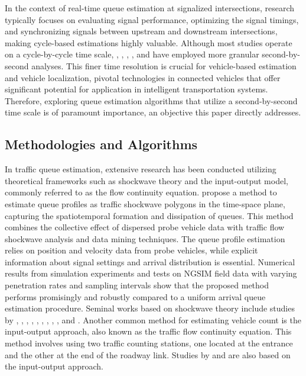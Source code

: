 In the context of real-time queue estimation at signalized intersections, research typically focuses on evaluating signal performance, optimizing the signal timings, and synchronizing signals between upstream and downstream intersections, making cycle-based estimations highly valuable. Although most studies operate on a cycle-by-cycle time scale, \textcite{vigos2008real}, \textcite{vigos2010simplified}, \textcite{aljamal2020real}, \textcite{wang2021kalman}, and \textcite{hu2022high} have employed more granular second-by-second analyses. This finer time resolution is crucial for vehicle-based estimation and vehicle localization, pivotal technologies in connected vehicles that offer significant potential for application in intelligent transportation systems. Therefore, exploring queue estimation algorithms that utilize a second-by-second time scale is of paramount importance, an objective this paper directly addresses.

\subsection{Methodologies and Algorithms}\label{LR: Methodologies and Algorithms}
In traffic queue estimation, extensive research has been conducted utilizing theoretical frameworks such as shockwave theory and the input-output model, commonly referred to as the flow continuity equation. \textcite{ramezani2015queue} propose a method to estimate queue profiles as traffic shockwave polygons in the time-space plane, capturing the spatiotemporal formation and dissipation of queues. This method combines the collective effect of dispersed probe vehicle data with traffic flow shockwave analysis and data mining techniques. The queue profile estimation relies on position and velocity data from probe vehicles, while explicit information about signal settings and arrival distribution is essential. Numerical results from simulation experiments and tests on NGSIM field data with varying penetration rates and sampling intervals show that the proposed method performs promisingly and robustly compared to a uniform arrival queue estimation procedure. Seminal works based on shockwave theory include studies by \textcite{liu2009real}, \textcite{cheng2012exploratory}, \textcite{cai2014shock}, \textcite{wang2015cycle}, \textcite{gao2019connected}, \textcite{yao2019cycle}, \textcite{ban2011real}, \textcite{cheng2011cycle}, , and \textcite{wang2020queue}. Another common method for estimating vehicle count is the input-output approach, also known as the traffic flow continuity equation. This method involves using two traffic counting stations, one located at the entrance and the other at the end of the roadway link. Studies by \textcite{sharma2007input} and \textcite{an2018real} are also based on the input-output approach.

